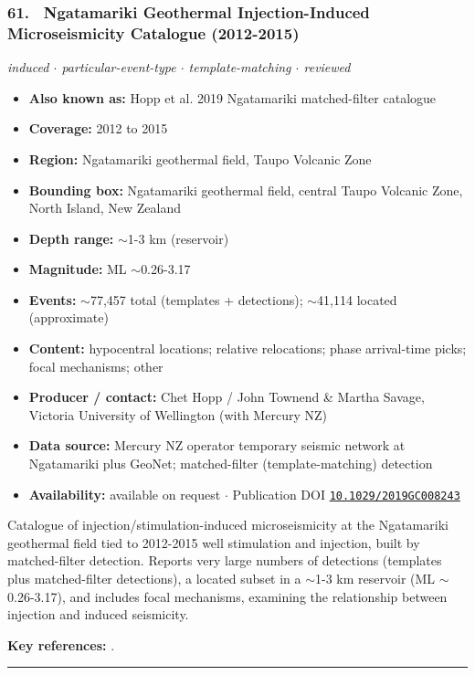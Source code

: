 \documentclass[10pt,a4paper]{article}
\newcommand{\catentryrule}{\par\vspace{3pt}\noindent\textcolor{rulegrey}{\rule{\linewidth}{0.3pt}}\par\vspace{5pt}}
\newcommand{\kv}[2]{\item \textbf{#1:} #2}
\begin{document}
\subsubsection*{\hypertarget{c:61}{61.}~ Ngatamariki Geothermal Injection-Induced Microseismicity Catalogue (2012-2015)}
{\small\itshape induced $\cdot$ particular-event-type $\cdot$ template-matching $\cdot$ reviewed}\par\vspace{2pt}
\begin{itemize}[leftmargin=1.3em,itemsep=0.6pt,topsep=1pt,parsep=0pt]
\kv{Also known as}{Hopp et al. 2019 Ngatamariki matched-filter catalogue}
\kv{Coverage}{2012 to 2015}
\kv{Region}{Ngatamariki geothermal field, Taupo Volcanic Zone}
\kv{Bounding box}{Ngatamariki geothermal field, central Taupo Volcanic Zone, North Island, New Zealand}
\kv{Depth range}{$\sim$1-3 km (reservoir)}
\kv{Magnitude}{ML $\sim$0.26-3.17}
\kv{Events}{$\sim$77,457 total (templates + detections); $\sim$41,114 located (approximate)}
\kv{Content}{hypocentral locations; relative relocations; phase arrival-time picks; focal mechanisms; other}
\kv{Producer / contact}{Chet Hopp / John Townend \& Martha Savage, Victoria University of Wellington (with Mercury NZ)}
\kv{Data source}{Mercury NZ operator temporary seismic network at Ngatamariki plus GeoNet; matched-filter (template-matching) detection}
\kv{Availability}{available on request $\cdot$ Publication DOI \href{https://doi.org/10.1029/2019GC008243}{\nolinkurl{10.1029/2019GC008243}}}
\end{itemize}
\par\vspace{2pt}Catalogue of injection/stimulation-induced microseismicity at the Ngatamariki geothermal field tied to 2012-2015 well stimulation and injection, built by matched-filter detection. Reports very large numbers of detections (templates plus matched-filter detections), a located subset in a $\sim$1-3 km reservoir (ML $\sim$0.26-3.17), and includes focal mechanisms, examining the relationship between injection and induced seismicity.
\par\vspace{2pt}\textbf{Key references:} \cite{Hopp2019}.
\catentryrule
\end{document}
